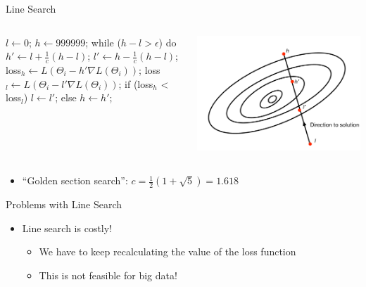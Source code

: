 \documentclass[aspectratio=169]{beamer}
\begin{document}
\begin{frame}[fragile]{Line Search}

\begin{columns}[T]
\begin{column}{0.5\textwidth}
\begin{SQL}
$l \leftarrow 0$;
$h \leftarrow 999999$;
while ($h - l > \epsilon$) do {
  $h' \leftarrow l + \frac{1}{c}(h - l)$;
  $l' \leftarrow h - \frac{1}{c}(h - l)$;
  loss$_h \leftarrow L (\Theta_{i} - h' \nabla L (\Theta_{i}))$;
  loss$_l \leftarrow L (\Theta_{i} - l' \nabla L (\Theta_{i}))$;
  if (loss$_h$ < loss$_l$) {
    $l \leftarrow l'$;
  else
    $h \leftarrow h'$;
  }
}
\end{SQL}
\end{column}
\begin{column}{0.5\textwidth}
\includegraphics[width=1\textwidth]{lectGD/lineSearch2.pdf}
\end{column}
\end{columns}

\begin{itemize}
\item ``Golden section search'': $c = \frac{1}{2}(1 + \sqrt{5}) = 1.618$
\end{itemize}
	
\end{frame}
\begin{frame}{Problems with Line Search}

\begin{itemize}
\item Line search is costly!
\begin{itemize}
\item We have to keep recalculating the value of the loss function
\item This is not feasible for big data!
\end{itemize}
\end{itemize}
\end{frame}
\end{document}
